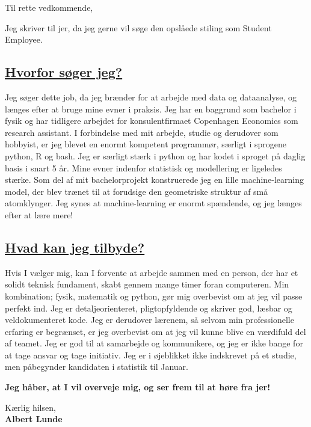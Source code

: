 
\subject{Ansøgning som Student Employee ved Danske Commodities}
\coverletter[sender=true, vspace=4mm]

Til rette vedkommende,

Jeg skriver til jer, da jeg gerne vil søge den opslåede stiling som Student Employee. 
\vspace{2mm}
\subsection*{\underline{Hvorfor søger jeg?}}
\vspace{2mm}
Jeg søger dette job, da jeg brænder for at arbejde med data og dataanalyse, og længes efter at bruge mine evner i praksis. Jeg har en baggrund som bachelor i fysik og har tidligere arbejdet for konsulentfirmaet Copenhagen Economics som research assistant. I forbindelse med mit arbejde, studie og derudover som hobbyist, er jeg blevet en enormt kompetent programmør, særligt i sprogene python, R og bash. Jeg er særligt stærk i python og har kodet i sproget på daglig basis i snart 5 år. Mine evner indenfor statistisk og modellering er ligeledes stærke. Som del af mit bachelorprojekt konstruerede jeg en lille machine-learning model, der blev trænet til at forudsige den geometriske struktur af små atomklynger. Jeg synes at machine-learning er enormt spændende, og jeg længes efter at lære mere! 
\subsection*{\underline{Hvad kan jeg tilbyde?}}
\vspace{2mm}
Hvis I vælger mig, kan I forvente at arbejde sammen med en person, der har et solidt teknisk fundament, skabt gennem mange timer foran computeren. Min kombination; fysik, matematik og python, gør mig overbevist om at jeg vil passe perfekt ind. Jeg er detaljeorienteret, pligtopfyldende og skriver god, læsbar og veldokumenteret kode. Jeg er derudover lærenem, så selvom min professionelle erfaring er begrænset, er jeg overbevist om at jeg vil kunne blive en værdifuld del af teamet. Jeg er god til at samarbejde og kommunikere, og jeg er ikke bange for at tage ansvar og tage initiativ. Jeg er i øjeblikket ikke indskrevet på et studie, men påbegynder kandidaten i statistik til Januar.
\vspace*{5mm}
\centerline{\textbf{Jeg håber, at I vil overveje mig, og ser frem til at høre fra jer!}}
\vspace*{5mm}

Kærlig hilsen, \\

\textbf{Albert Lunde}
